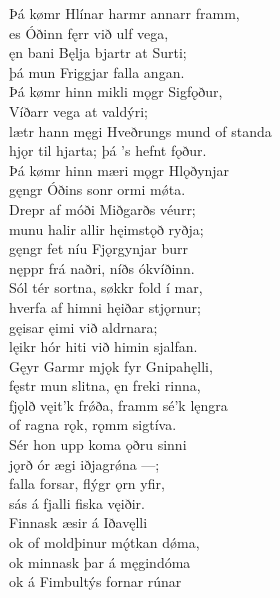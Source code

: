 \bva Þá kømr Hlínar \hld harmr annarr framm, \\%
es Óðinn fęrr \hld við ulf vega, \\%
ęn bani Bęlja \hld bjartr at Surti; \\%
þá mun Friggjar \hld falla angan.\\%

\bva Þá kømr hinn mikli \hld mǫgr Sigfǫður, \\%
Víðarr vega \hld at valdýri; \\%
lætr hann męgi Hveðrungs \hld mund of standa \\%
hjǫr til hjarta; \hld þá ’s hefnt fǫður.\\%

\bva Þá kømr hinn mæri \hld mǫgr Hlǫðynjar \\%
gęngr Óðins sonr \hld ormi mǿta. \\%
Drepr af móði \hld Miðgarðs véurr; \\%
munu halir allir \hld hęimstǫð ryðja; \\%
gęngr fet níu \hld Fjǫrgynjar burr \\%
nęppr frá naðri, \hld níðs ókvíðinn.\\%

\bva Sól tér sortna, \hld søkkr fold í mar, \\%
hverfa af himni \hld hęiðar stjǫrnur; \\%
gęisar ęimi \hld við aldrnara; \\%
lęikr hór hiti \hld við himin sjalfan.\\%

\bva Gęyr Garmr mjǫk \hld fyr Gnipahęlli, \\%
fęstr mun slitna, \hld ęn freki rinna, \\%
fjǫlð vęit'k frǿða, \hld framm sé'k lęngra \\%
of ragna rǫk, \hld rǫmm sigtíva.\\%

\bva Sér hon upp koma \hld ǫðru sinni \\%
jǫrð ór ægi \hld iðjagrǿna —; \\%
falla forsar, \hld flýgr ǫrn yfir, \\%
sás á fjalli \hld fiska vęiðir.\\%

\bva Finnask æsir \hld á Iðavęlli \\%
ok of moldþinur \hld mǫ́tkan dǿma, \\%
ok minnask þar \hld á męgindóma \\%
ok á Fimbultýs \hld fornar rúnar\\%

